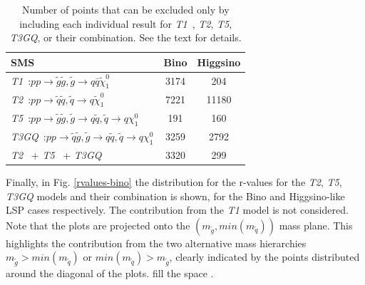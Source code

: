 \documentclass[a4paper,11pt]{article}
\newcommand{\TGQ}{ \textit{T3GQ}}
\newcommand{\Tone}{ \textit{T1}}
\newcommand{\Ttwo}{ \textit{T2}}
\newcommand{\Tfive}{ \textit{T5}}
\begin{document}
\begin{table}[!h]
	\footnotesize
	\begin{center}
		\renewcommand{\arraystretch}{1.3}
		\begin{tabular}{ l c c }  \toprule \toprule
			\textbf{SMS} & \textbf{Bino} & \textbf{Higgsino} \\  \toprule
			\Tone~:$p p \rightarrow \tilde g \tilde g , \tilde g \rightarrow q \bar q \tilde \chi_1 ^0$ & 3174 & 204   \\
			\Ttwo~:$p p \rightarrow \tilde q \tilde q , \tilde q \rightarrow q \tilde \chi_1 ^0$ & 7221 & 11180 \\
			\Tfive~:$p p \rightarrow \tilde g \tilde g , \tilde g \rightarrow q \tilde q , \tilde q  \rightarrow q \chi_1 ^0$ & 191 & 160  \\
			\TGQ~:$p p \rightarrow \tilde q \tilde g , \tilde g \rightarrow q \tilde q , \tilde q  \rightarrow q \chi_1 ^0$ & 3259 & 2792  \\
			\Ttwo~ +\Tfive~ +\TGQ~ & 3320 & 299 \\
			\bottomrule \bottomrule 
		\end{tabular}
	\end{center}
	\caption{Number of points that can be excluded only by including each individual result for \Tone~,\Ttwo,\Tfive,\TGQ, or their combination. See the text for details.}
	\label{breakdown_number} 
\end{table}
Finally, in Fig. \ref{rvalues-bino} the distribution for the r-values for the \textit{T2}, \textit{T5}, \textit{T3GQ} models and their combination is shown, for the Bino and Higgsino-like LSP cases respectively. The contribution from the \textit{T1} model is not considered. Note that the plots are projected onto the $(m_{\tilde g}, min(m_{\tilde q}))$ mass plane. This highlights the contribution from the two alternative mass hierarchies $m_{\tilde g} > min(m_{\tilde q})$ or $min(m_{\tilde q}) > m_{\tilde g} $, clearly indicated by the points distributed around the diagonal of the plots.  {\color{blue} fill the space .}
\end{document}
